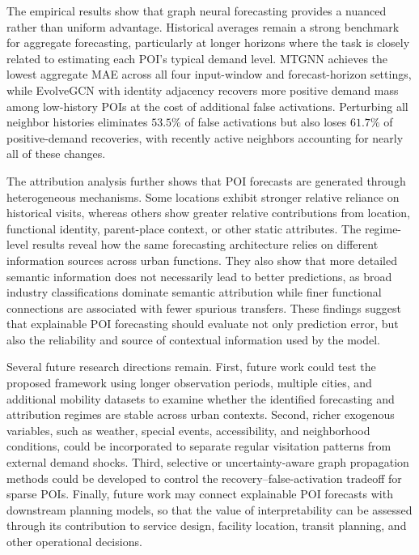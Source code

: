 \documentclass[preprint,authoryear,11pt]{elsarticle}
\theoremstyle{definition}
\begin{document}
The empirical results show that graph neural forecasting provides a nuanced rather than uniform advantage. Historical averages remain a strong benchmark for aggregate forecasting, particularly at longer horizons where the task is closely related to estimating each POI's typical demand level. 
MTGNN achieves the lowest aggregate MAE across all four input-window and forecast-horizon settings, while EvolveGCN with identity adjacency recovers more positive demand mass among low-history POIs at the cost of additional false activations.
Perturbing all neighbor histories eliminates \(53.5\%\) of false activations but also loses \(61.7\%\) of positive-demand recoveries, with recently active neighbors accounting for nearly all of these changes.


The attribution analysis further shows that POI forecasts are generated through heterogeneous mechanisms. 
Some locations exhibit stronger relative reliance on historical visits, whereas others show greater relative contributions from location, functional identity, parent-place context, or other static attributes.
The regime-level results reveal how the same forecasting architecture relies on different information sources across urban functions.
They also show that more detailed semantic information does not necessarily lead to better predictions, as broad industry classifications dominate semantic attribution while finer functional connections are associated with fewer spurious transfers.
These findings suggest that explainable POI forecasting should evaluate not only prediction error, but also the reliability and source of contextual information used by the model.

Several future research directions remain. First, future work could test the proposed framework using longer observation periods, multiple cities, and additional mobility datasets to examine whether the identified forecasting and attribution regimes are stable across urban contexts. Second, richer exogenous variables, such as weather, special events, accessibility, and neighborhood conditions, could be incorporated to separate regular visitation patterns from external demand shocks. Third, selective or uncertainty-aware graph propagation methods could be developed to control the recovery--false-activation tradeoff for sparse POIs. Finally, future work may connect explainable POI forecasts with downstream planning models, so that the value of interpretability can be assessed through its contribution to service design, facility location, transit planning, and other operational decisions.

\newpage
\begingroup
\singlespacing


\endgroup
\end{document}
